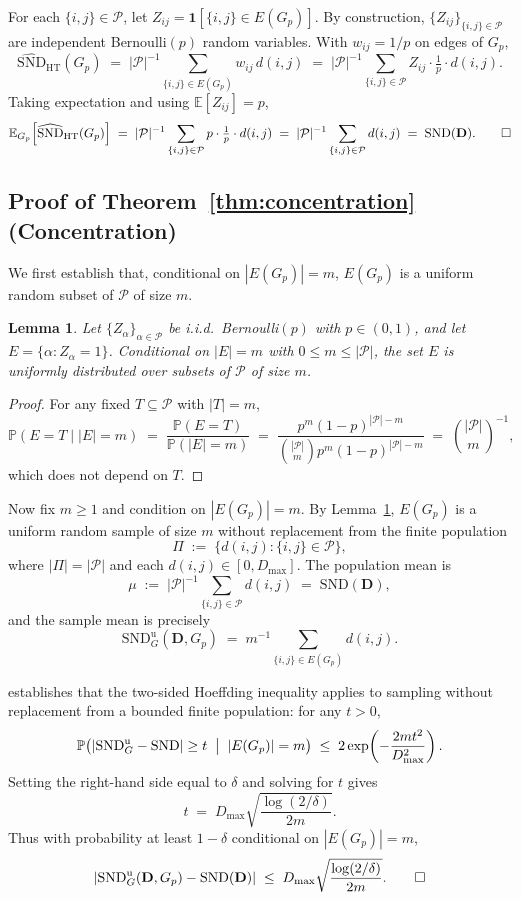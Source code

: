 \documentclass{article}
\theoremstyle{plain}
\newtheorem{lemma}[theorem]{Lemma}
\theoremstyle{definition}
\theoremstyle{remark}
\newcommand{\E}{\mathbb{E}}
\newcommand{\Prob}{\mathbb{P}}
\newcommand{\Pairs}{\mathcal{P}}         %
\newcommand{\SND}{\ensuremath{\mathrm{SND}}}
\newcommand{\SNDG}{\mathrm{SND}_{G}}
\newcommand{\abs}[1]{\left\lvert #1 \right\rvert}
\newcommand{\ind}{\mathbf{1}}
\begin{document}
For each $\{i,j\} \in \Pairs$, let $Z_{ij} = \ind[\{i,j\} \in E(G_p)]$.
By construction, $\{Z_{ij}\}_{\{i,j\} \in \Pairs}$ are independent
Bernoulli$(p)$ random variables. With $w_{ij} = 1/p$ on edges of $G_p$,
\[
\widehat{\SND}_{\mathrm{HT}}(G_p)
\;=\; |\Pairs|^{-1} \sum_{\{i,j\} \in E(G_p)} w_{ij}\, d(i,j)
\;=\; |\Pairs|^{-1} \sum_{\{i,j\} \in \Pairs} Z_{ij} \cdot \tfrac{1}{p}
\cdot d(i,j).
\]
Taking expectation and using $\E[Z_{ij}] = p$,
\[
\E_{G_p}\!\left[\widehat{\SND}_{\mathrm{HT}}(G_p)\right]
\;=\; |\Pairs|^{-1} \sum_{\{i,j\} \in \Pairs}
p \cdot \tfrac{1}{p} \cdot d(i,j)
\;=\; |\Pairs|^{-1} \sum_{\{i,j\} \in \Pairs} d(i,j)
\;=\; \SND(\mathbf{D}). \qed
\]

\subsection*{Proof of Theorem~\ref{thm:concentration} (Concentration)}

We first establish that, conditional on $|E(G_p)| = m$, $E(G_p)$ is a
uniform random subset of $\Pairs$ of size $m$.

\begin{lemma}
\label{lem:conditional-uniform}
Let $\{Z_\alpha\}_{\alpha \in \Pairs}$ be i.i.d.\ Bernoulli$(p)$ with
$p \in (0,1)$, and let $E = \{\alpha : Z_\alpha = 1\}$. Conditional on
$|E| = m$ with $0 \leq m \leq |\Pairs|$, the set $E$ is uniformly
distributed over subsets of $\Pairs$ of size $m$.
\end{lemma}
\begin{proof}
For any fixed $T \subseteq \Pairs$ with $|T| = m$,
\[
\Prob(E = T \mid |E| = m)
\;=\; \frac{\Prob(E = T)}{\Prob(|E| = m)}
\;=\; \frac{p^m (1-p)^{|\Pairs|-m}}
          {\binom{|\Pairs|}{m} p^m (1-p)^{|\Pairs|-m}}
\;=\; \binom{|\Pairs|}{m}^{-1},
\]
which does not depend on $T$.
\end{proof}

Now fix $m \geq 1$ and condition on $|E(G_p)| = m$. By
Lemma~\ref{lem:conditional-uniform}, $E(G_p)$ is a uniform random sample
of size $m$ without replacement from the finite population
\[
\Pi \;:=\; \bigl\{ d(i,j) : \{i,j\} \in \Pairs \bigr\},
\]
where $|\Pi| = |\Pairs|$ and each $d(i,j) \in [0, D_{\max}]$. The
population mean is
\[
\mu \;:=\; |\Pairs|^{-1} \sum_{\{i,j\} \in \Pairs} d(i,j) \;=\; \SND(\mathbf{D}),
\]
and the sample mean is precisely
\[
\SNDG^{\mathrm{u}}(\mathbf{D}, G_p) \;=\; m^{-1} \sum_{\{i,j\} \in E(G_p)} d(i,j).
\]

\citet[Section 6, Theorem 4]{hoeffding1963probability} establishes that
the two-sided Hoeffding inequality applies to sampling without
replacement from a bounded finite population: for any $t > 0$,
\begin{equation}
\label{eq:hoeff-wor}
\Prob\bigl(\abs{\SNDG^{\mathrm{u}} - \SND} \geq t \;\bigm|\; |E(G_p)| = m\bigr)
\;\leq\; 2\exp\!\left(- \frac{2 m t^2}{D_{\max}^2}\right).
\end{equation}
Setting the right-hand side equal to $\delta$ and solving for $t$ gives
\[
t \;=\; D_{\max}\sqrt{\frac{\log(2/\delta)}{2m}}.
\]
Thus with probability at least $1 - \delta$ conditional on $|E(G_p)| = m$,
\[
\abs{\SNDG^{\mathrm{u}}(\mathbf{D}, G_p) - \SND(\mathbf{D})}
\;\leq\; D_{\max}\sqrt{\frac{\log(2/\delta)}{2m}}. \qed
\]
\end{document}
